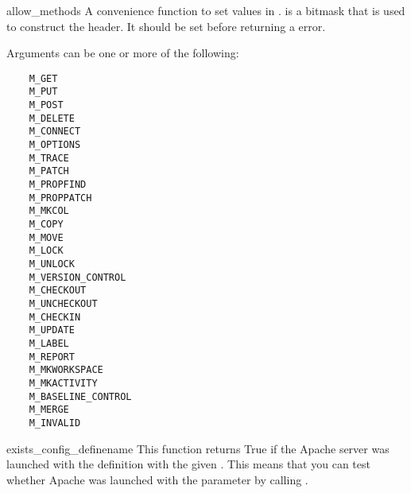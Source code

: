\begin{funcdesc}{allow_methods}{}
  A convenience function to set values in .
   is a bitmask that is used to construct the
   header. It should be set before returning a
   error.

  Arguments can be one or more of the following:
  \begin{verbatim}
    M_GET
    M_PUT
    M_POST
    M_DELETE
    M_CONNECT
    M_OPTIONS
    M_TRACE
    M_PATCH
    M_PROPFIND
    M_PROPPATCH
    M_MKCOL
    M_COPY
    M_MOVE
    M_LOCK
    M_UNLOCK
    M_VERSION_CONTROL
    M_CHECKOUT
    M_UNCHECKOUT
    M_CHECKIN
    M_UPDATE
    M_LABEL
    M_REPORT
    M_MKWORKSPACE
    M_MKACTIVITY
    M_BASELINE_CONTROL
    M_MERGE
    M_INVALID
  \end{verbatim}

\end{funcdesc}

\begin{funcdesc}{exists_config_define}{name}
    This function returns True if the Apache server was launched
    with the definition with the given . This means
    that you can test whether Apache was launched with the 
    parameter by calling .
\end{funcdesc}


